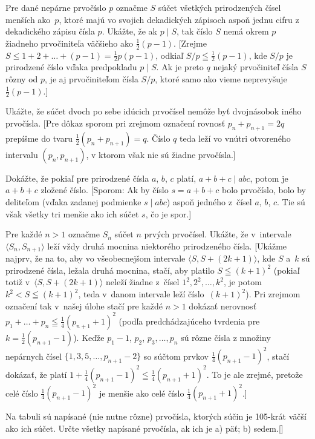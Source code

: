 {Pre dané nepárne prvočíslo $p$ označme $S$ súčet všetkých
prirodzených čísel menších ako~$p$, ktoré majú
vo svojich dekadických zápisoch aspoň jednu cifru z dekadického
zápisu čísla $p$. Ukážte, že ak $p \mid S$, tak číslo $S$
nemá okrem $p$ žiadneho prvočiniteľa
väčšieho ako $\frac12(p-1)$.
[Zrejme $S\leq1+2+\ldots+(p-1)=\frac12p(p-1)$,
odkiaľ $S/p\leqq\frac12(p-1)$, kde $S/p$ je prirodzené
číslo vďaka predpokladu $p\mid S$. Ak je preto $q$ nejaký
prvočiniteľ čísla $S$ rôzny od $p$, je aj prvočiniteľom
čísla $S/p$, ktoré samo ako vieme neprevyšuje $\frac12(p-1)$.]

\D
Ukážte, že súčet dvoch po sebe idúcich prvočísel nemôže byť
dvojnásobok iného prvočísla.
[Pre dôkaz sporom pri zrejmom
označení rovnosť $p_n+p_{n+1}=2q$ prepíšme do tvaru
$\frac12(p_n+p_{n+1})=q$. Číslo $q$ teda leží vo vnútri
otvoreného intervalu $(p_n,p_{n+1})$, v ktorom však
nie sú žiadne prvočísla.]

Dokážte, že pokiaľ pre prirodzené čísla $a$, $b$, $c$ platí,
$a+b+c\mid abc$, potom je $a+b+c$
zložené číslo.
[Sporom: Ak by číslo $s=a+b+c$
bolo prvočíslo, bolo by deliteľom (vďaka zadanej podmienke $s\mid abc$)
aspoň jedného z~čísel $a$, $b$, $c$. Tie sú však všetky tri menšie ako
ich súčet $s$, čo je spor.]

Pre každé $n>1$ označme $S_n$ súčet $n$ prvých prvočísel.
Ukážte, že v~intervale $\langle S_n, S_{n+1} \rangle$ leží
vždy druhá mocnina niektorého prirodzeného čísla.
[Ukážme najprv, že na to, aby vo všeobecnejšom intervale
$\langle S,S+(2k+1)\rangle$, kde $S$ a~$k$ sú prirodzené
čísla, ležala druhá mocnina, stačí, aby platilo
$S\leqq(k+1)^2$ (pokiaľ totiž v~$\langle S,S+(2k+1)\rangle$
neleží žiadne z~čísel $1^2,2^2,\dots,k^2$, je potom
$k^2<S\leqq(k+1)^2$, teda v~danom intervale
leží číslo~$(k+1)^2$).
Pri zrejmom označení tak v~našej úlohe stačí pre každé $n>1$ dokázať
nerovnosť $p_1+\ldots+p_n\leqq\frac14(p_{n+1}+1)^2$
(podľa predchádzajúceho tvrdenia pre $k=\frac12(p_{n+1}-1)$).
Keďže
$p_1-1$, $p_2$, $p_3,\dots,p_n$ sú rôzne čísla
z množiny nepárnych čísel $\{1,3,5,\dots,p_{n+1}-2\}$ so súčtom prvkov
$\frac14(p_{n+1}-1)^2$, stačí dokázať, že platí
$1+\frac14(p_{n+1}-1)^2\leqq\frac14(p_{n+1}+1)^2$.
To je ale zrejmé, pretože celé číslo $\frac14(p_{n+1}-1)^2$ je menšie
ako celé číslo $\frac14(p_{n+1}+1)^2$.]

Na tabuli sú napísané (nie nutne rôzne) prvočísla, ktorých súčin je 105-krát väčší ako ich súčet. Určte všetky napísané prvočísla, ak ich je
a) päť; b) sedem.[]

}

